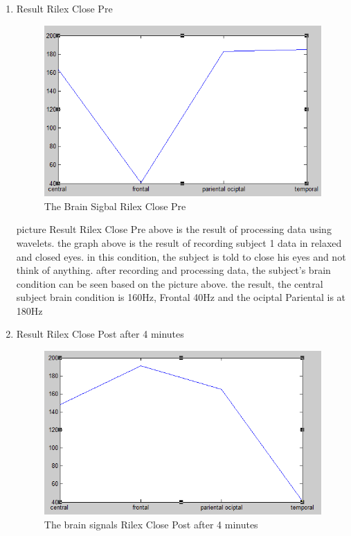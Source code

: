 \begin{enumerate}
 \item Result Rilex Close Pre
     \begin{figure}[h!]
\centering
\includegraphics[scale=0.6]{figures/hasil1.PNG}
\caption{The Brain Sigbal Rilex Close Pre}
\label{labelgambar5}
\end{figure}

\par
picture Result Rilex Close Pre above is the result of processing data using wavelets. the graph above is the result of recording subject 1 data in relaxed and closed eyes. in this condition, the subject is told to close his eyes and not think of anything. after recording and processing data, the subject's brain condition can be seen based on the picture above. the result, the central subject brain condition is 160Hz, Frontal 40Hz and the ociptal Pariental is at 180Hz

\item Result Rilex Close Post after 4 minutes
\begin{figure}[h!]
\centering
\includegraphics[scale=0.6]{figures/hasil2.PNG}
\caption{The brain signals Rilex Close Post after 4 minutes}
\label{labelgambar12}
\end{figure}


\end{enumerate}
